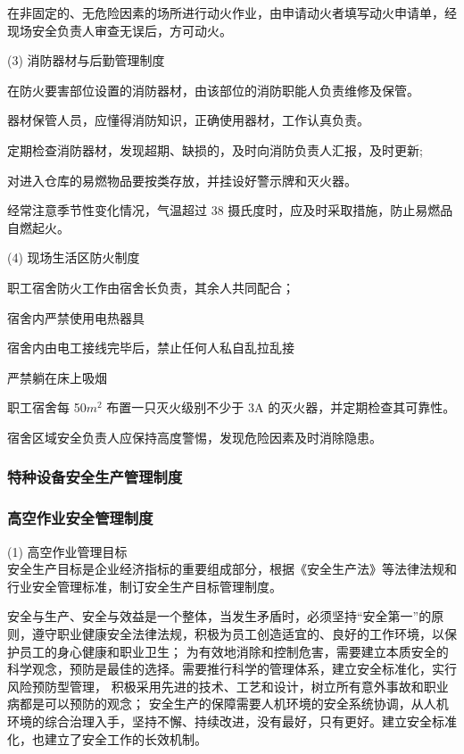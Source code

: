  在非固定的、无危险因素的场所进行动火作业，由申请动火者填写动火申请单，经现场安全负责人审查无误后，方可动火。

(3) 消防器材与后勤管理制度

 在防火要害部位设置的消防器材，由该部位的消防职能人负责维修及保管。

 器材保管人员，应懂得消防知识，正确使用器材，工作认真负责。

 定期检查消防器材，发现超期、缺损的，及时向消防负责人汇报，及时更新;

 对进入仓库的易燃物品要按类存放，并挂设好警示牌和灭火器。

 经常注意季节性变化情况，气温超过 38 摄氏度时，应及时采取措施，防止易燃品自燃起火。

(4) 现场生活区防火制度

职工宿舍防火工作由宿舍长负责，其余人共同配合；

宿舍内严禁使用电热器具

宿舍内由电工接线完毕后，禁止任何人私自乱拉乱接

严禁躺在床上吸烟

职工宿舍每 50$m^2$ 布置一只灭火级别不少于 3A 的灭火器，并定期检查其可靠性。

宿舍区域安全负责人应保持高度警惕，发现危险因素及时消除隐患。

\subsubsection{特种设备安全生产管理制度}

\subsubsection{高空作业安全管理制度}

(1) 高空作业管理目标\\

安全生产目标是企业经济指标的重要组成部分，根据《安全生产法》等法律法规和行业安全管理标准，制订安全生产目标管理制度。

安全与生产、安全与效益是一个整体，当发生矛盾时，必须坚持“安全第一”的原则，遵守职业健康安全法律法规，积极为员工创造适宜的、良好的工作环境，以保护员工的身心健康和职业卫生；
为有效地消除和控制危害，需要建立本质安全的科学观念，预防是最佳的选择。需要推行科学的管理体系，建立安全标准化，实行风险预防型管理，
积极采用先进的技术、工艺和设计，树立所有意外事故和职业病都是可以预防的观念；
安全生产的保障需要人机环境的安全系统协调，从人机环境的综合治理入手，坚持不懈、持续改进，没有最好，只有更好。建立安全标准化，也建立了安全工作的长效机制。\\

